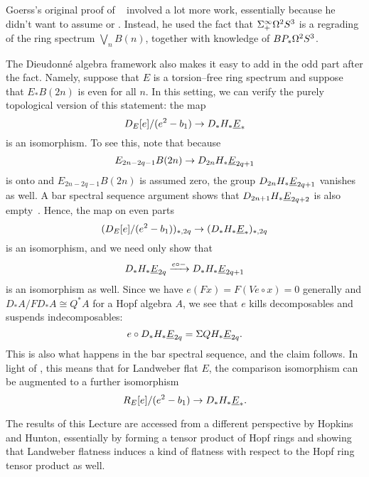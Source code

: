 \begin{remark}
Goerss's original proof of ~\cite{GoerssDieudonne} involved a lot more work, essentially because he didn't want to assume  or .  Instead, he used the fact that \(\Sigma^\infty_+ \Omega^2 S^3\) is a regrading of the ring spectrum \(\bigvee_n B(n)\), together with knowledge of \(BP_* \Omega^2 S^3\).
\end{remark}

\begin{remark}
The Dieudonn\'e algebra framework also makes it easy to add in the odd part after the fact.  Namely, suppose that \(E\) is a torsion--free ring spectrum and suppose that \(E_* B(2n)\) is even for all \(n\).  In this setting, we can verify the purely topological version of this statement: the map \[D_E[e] / (e^2 - b_1) \to D_* H_* \OS{E}{*}\] is an isomorphism.  To see this, note that because \[E_{2n-2q-1} B(2n) \to D_{2n} H_* \OS{E}{2q+1}\] is onto and \(E_{2n-2q-1} B(2n)\) is assumed zero, the group \(D_{2n} H_* \OS{E}{2q+1}\) vanishes as well.  A bar spectral sequence argument shows that \(D_{2n+1} H_* \OS{E}{2q+2}\) is also empty~\cite[Lemma 11.5.1]{GoerssDieudonne}.  Hence, the map on even parts \[(D_E[e] / (e^2 - b_1))_{*, 2q} \to (D_* H_* \OS{E}{*})_{*, 2q}\] is an isomorphism, and we need only show that \[D_* H_* \OS{E}{2q} \xrightarrow{e \circ -} D_* H_* \OS{E}{2q+1}\] is an isomorphism as well.  Since we have \(e(Fx) = F(Ve \circ x) = 0\) generally and \(D_* A / FD_* A \cong Q^* A\) for a Hopf algebra \(A\), we see that \(e\) kills decomposables and suspends indecomposables: \[e \circ D_* H_* \OS{E}{2q} = \Susp QH_* \OS{E}{2q}.\]  This is also what happens in the bar spectral sequence, and the claim follows.  In light of , this means that for Landweber flat \(E\), the comparison isomorphism can be augmented to a further isomorphism \[R_E[e] / (e^2 - b_1) \to D_* H_* \OS{E}{*}.\]
\end{remark}

\begin{remark}
The results of this Lecture are accessed from a different perspective by Hopkins and Hunton, essentially by forming a tensor product of Hopf rings and showing that Landweber flatness induces a kind of flatness with respect to the Hopf ring tensor product as well.
\end{remark}


